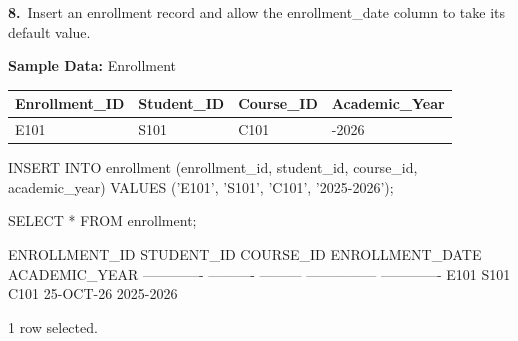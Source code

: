 \noindent\begin{minipage}{\linewidth}
\begingroup{}
{\fontsize{14}{17}\selectfont\textbf{8.}}\ Insert an enrollment record and allow the enrollment\_date column to take its default value.\par
\endgroup\vspace{12pt}

\noindent\textbf{Sample Data:} Enrollment\par
\vspace{6pt}
{\small\setlength{\tabcolsep}{4pt}
\renewcommand{\arraystretch}{1.25}
\noindent\begin{tabular}{|>{\raggedright\arraybackslash}p{125.6pt}|>{\raggedright\arraybackslash}p{108.7pt}|>{\raggedright\arraybackslash}p{105.6pt}|>{\raggedright\arraybackslash}p{128.2pt}|}
\hline
\textbf{Enrollment\_ID} & \textbf{Student\_ID} & \textbf{Course\_ID} & \textbf{Academic\_Year} \\ \hline
E101 & S101 & C101 & 2025-2026 \\ \hline
\end{tabular}\par}
\vspace{14pt}

\begin{sqlcode}
INSERT INTO enrollment (enrollment_id, student_id, course_id, academic_year)
VALUES ('E101', 'S101', 'C101', '2025-2026');

SELECT * FROM enrollment;
\end{sqlcode}

\vspace{18pt}


\begin{sqlout}[fontsize=\small]
ENROLLMENT_ID  STUDENT_ID  COURSE_ID  ENROLLMENT_DATE  ACADEMIC_YEAR
-------------  ----------  ---------  ---------------  -------------
E101           S101        C101       25-OCT-26        2025-2026

1 row selected.
\end{sqlout}
\end{minipage}\par\vspace{24pt}

